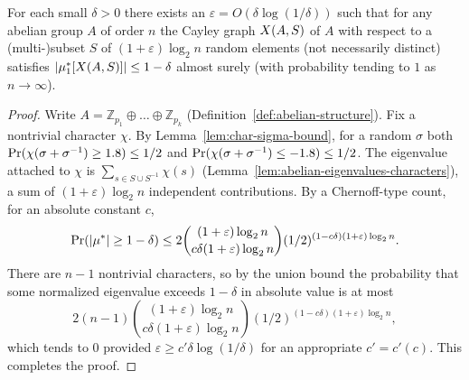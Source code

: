 \begin{theorem}
  \label{thm:theorem2}
  For each small $\delta > 0$ there exists an
  $\varepsilon = O(\delta\log(1/\delta))$ such that for any abelian group $A$ of
  order $n$ the Cayley graph $X(A,S)$ of $A$ with respect to a (multi-)subset
  $S$ of $(1+\varepsilon)\log_2 n$ random elements (not necessarily distinct)
  satisfies $|\mu_{1}^{*}[X(A,S)]| \le 1 - \delta$ almost surely (with probability
  tending to $1$ as $n \to \infty$).
\end{theorem}
\begin{proof}
  Write $A = \mathbb{Z}_{p_1}\oplus\dots\oplus\mathbb{Z}_{p_k}$
  (Definition~\ref{def:abelian-structure}). Fix a nontrivial character $\chi$.
  By Lemma~\ref{lem:char-sigma-bound}, for a random $\sigma$ both
  $\operatorname{Pr}(\chi(\sigma+\sigma^{-1}) \ge 1.8) \le 1/2$ and
  $\operatorname{Pr}(\chi(\sigma+\sigma^{-1}) \le -1.8) \le 1/2$. The eigenvalue attached to
  $\chi$ is $\sum_{s \in S \cup S^{-1}}\chi(s)$
  (Lemma~\ref{lem:abelian-eigenvalues-characters}), a sum of
  $(1+\varepsilon)\log_2 n$ independent contributions. By a Chernoff-type count,
  for an absolute constant $c$,
  \[
    \operatorname{Pr}(|\mu^{*}| \ge 1 - \delta)
      \le 2\binom{(1+\varepsilon)\log_2 n}{c\delta(1+\varepsilon)\log_2 n}
            (1/2)^{(1 - c\delta)(1+\varepsilon)\log_2 n}.
  \]
  There are $n - 1$ nontrivial characters, so by the union bound the probability
  that some normalized eigenvalue exceeds $1 - \delta$ in absolute value is at
  most
  \[
    2(n-1)\binom{(1+\varepsilon)\log_2 n}{c\delta(1+\varepsilon)\log_2 n}
            (1/2)^{(1 - c\delta)(1+\varepsilon)\log_2 n},
  \]
  which tends to $0$ provided $\varepsilon \ge c'\delta\log(1/\delta)$ for an
  appropriate $c' = c'(c)$. This completes the proof.
\end{proof}


